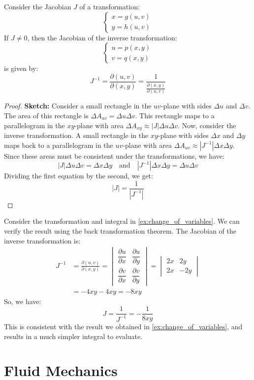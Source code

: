\documentclass[11pt]{report}
\begin{document}
\begin{theorem}
    Consider the Jacobian $J$ of a transformation:
    $$
    \begin{cases}
        x = g(u,v) \\
        y = h(u,v)
    \end{cases}
    $$
    If $J \neq 0$, then the Jacobian of the inverse transformation:
    $$
    \begin{cases}
        u = p(x,y) \\
        v = q(x,y)
    \end{cases}
    $$
    is given by:
    \begin{equation}
        J^{-1} = \frac{\partial(u,v)}{\partial(x,y)} = \frac{1}{\frac{\partial(x,y)}{\partial(u,v)}}
    \end{equation}
\end{theorem}
\begin{proof}
    \textbf{Sketch:} Consider a small rectangle in the $uv$-plane with sides $\Delta u$ and $\Delta v$. The area of this rectangle is $\Delta A_{uv} = \Delta u \Delta v$. This rectangle maps to a parallelogram in the $xy$-plane with area $\Delta A_{xy} \approx |J| \Delta u \Delta v$. Now, consider the inverse transformation. A small rectangle in the $xy$-plane with sides $\Delta x$ and $\Delta y$ maps back to a parallelogram in the $uv$-plane with area $\Delta A_{uv} \approx |J^{-1}| \Delta x \Delta y$. Since these areas must be consistent under the transformations, we have:
    $$
        |J| \Delta u \Delta v = \Delta x \Delta y \quad \text{and} \quad |J^{-1}| \Delta x \Delta y = \Delta u \Delta v
    $$
    Dividing the first equation by the second, we get:
    $$
        |J| = \frac{1}{|J^{-1}|}
    $$
\end{proof}

\begin{example}
    Consider the transformation and integral in \ref{ex:change_of_variables}. We can verify the result using the back transformation theorem. The Jacobian of the inverse transformation is:
    \begin{align*}
        J^{-1} &= \frac{\partial(u,v)}{\partial(x,y)} = \begin{vmatrix}
            \dfrac{\partial u}{\partial x} & \dfrac{\partial u}{\partial y} \\
            \dfrac{\partial v}{\partial x} & \dfrac{\partial v}{\partial y}
        \end{vmatrix} = \begin{vmatrix}
            2x & 2y \\
            2x & -2y
        \end{vmatrix} \\
        &= -4xy - 4xy = -8xy
    \end{align*}
    So, we have:
    $$        
        J = \frac{1}{J^{-1}} = -\frac{1}{8xy}
    $$
    This is consistent with the result we obtained in \ref{ex:change_of_variables}, and results in a much simpler integral to evaluate.
\end{example}
\chapter{Fluid Mechanics}
\end{document}
